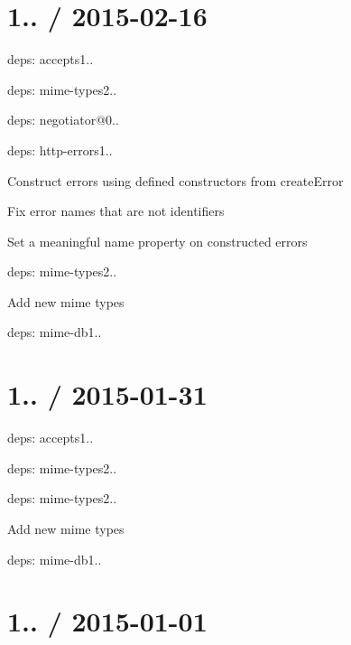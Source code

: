 \section*{1.. / 2015-\/02-\/16 }


\begin{DoxyItemize}
\item deps\+: accepts1..
\begin{DoxyItemize}
\item deps\+: mime-\/types2..
\item deps\+: negotiator@0..
\end{DoxyItemize}
\item deps\+: http-\/errors1..
\begin{DoxyItemize}
\item Construct errors using defined constructors from {\ttfamily create\+Error}
\item Fix error names that are not identifiers
\item Set a meaningful {\ttfamily name} property on constructed errors
\end{DoxyItemize}
\item deps\+: mime-\/types2..
\begin{DoxyItemize}
\item Add new mime types
\item deps\+: mime-\/db1..
\end{DoxyItemize}
\end{DoxyItemize}

\section*{1.. / 2015-\/01-\/31 }


\begin{DoxyItemize}
\item deps\+: accepts1..
\begin{DoxyItemize}
\item deps\+: mime-\/types2..
\end{DoxyItemize}
\item deps\+: mime-\/types2..
\begin{DoxyItemize}
\item Add new mime types
\item deps\+: mime-\/db1..
\end{DoxyItemize}
\end{DoxyItemize}

\section*{1.. / 2015-\/01-\/01 }


